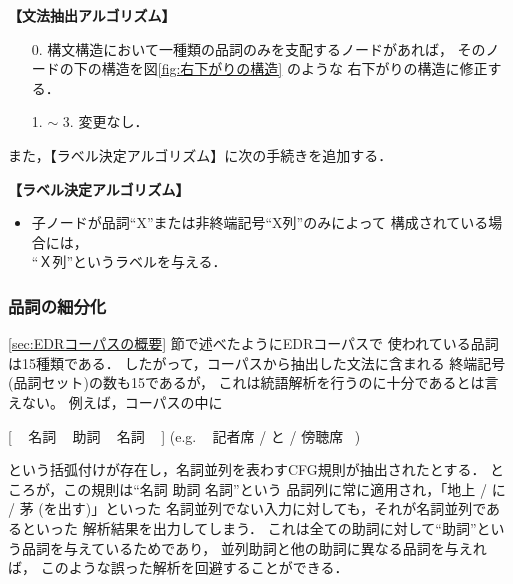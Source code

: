 \newpage
\begin{flushleft}
  {\bf 【文法抽出アルゴリズム】}
  \vspace*{-3mm}
\end{flushleft}

\begin{itemize}
\item[0.]
  構文構造において一種類の品詞のみを支配するノードがあれば，
  そのノードの下の構造を図\ref{fig:右下がりの構造} のような
  右下がりの構造に修正する．

\item[1.] $\sim$ 3. \hspace{5mm} 変更なし．
\end{itemize}

\bigskip
\noindent
また，【ラベル決定アルゴリズム】に次の手続きを追加する．
\begin{flushleft}
  {\bf 【ラベル決定アルゴリズム】}
  \vspace*{-3mm}
\end{flushleft}

\begin{itemize}
\item
  子ノードが品詞``X''または非終端記号``X列''のみによって
  構成されている場合には，\\
  ``Ｘ列''というラベルを与える．
\end{itemize}

\subsubsection{品詞の細分化}
\label{sec:品詞の細分化}

\ref{sec:EDRコーパスの概要} 節で述べたようにEDRコーパスで
使われている品詞は15種類である．
したがって，コーパスから抽出した文法に含まれる
終端記号(品詞セット)の数も15であるが，
これは統語解析を行うのに十分であるとは言えない。
例えば，コーパスの中に
\begin{center}
  [ ~ 名詞 ~ 助詞 ~ 名詞 ~ ] \qquad (e.g. ~ 記者席 / と / 傍聴席 ~)
\end{center}
という括弧付けが存在し，名詞並列を表わすCFG規則が抽出されたとする．
ところが，この規則は``名詞 助詞 名詞''という
品詞列に常に適用され，「地上 / に / 茅 (を出す)」といった
名詞並列でない入力に対しても，それが名詞並列であるといった
解析結果を出力してしまう．
これは全ての助詞に対して``助詞''という品詞を与えているためであり，
並列助詞と他の助詞に異なる品詞を与えれば，
このような誤った解析を回避することができる．

